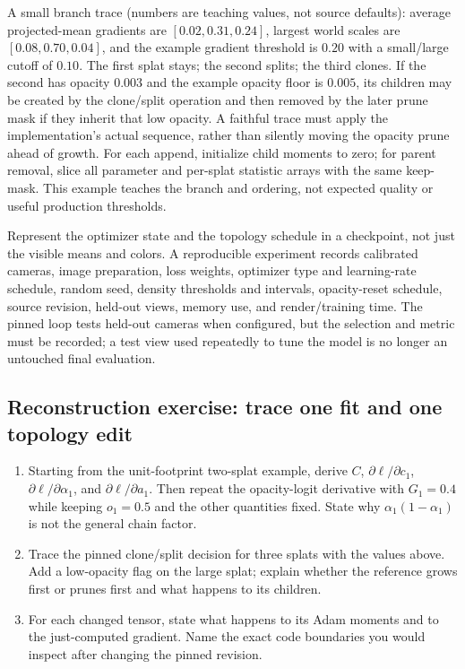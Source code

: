 A small branch trace (numbers are teaching values, not source defaults): average projected-mean gradients are \([0.02,0.31,0.24]\), largest world scales are \([0.08,0.70,0.04]\), and the example gradient threshold is \(0.20\) with a small/large cutoff of \(0.10\). The first splat stays; the second splits; the third clones. If the second has opacity \(0.003\) and the example opacity floor is \(0.005\), its children may be created by the clone/split operation and then removed by the later prune mask if they inherit that low opacity. A faithful trace must apply the implementation's actual sequence, rather than silently moving the opacity prune ahead of growth. For each append, initialize child moments to zero; for parent removal, slice all parameter and per-splat statistic arrays with the same keep-mask. This example teaches the branch and ordering, not expected quality or useful production thresholds.

Represent the optimizer state and the topology schedule in a checkpoint, not just the visible means and colors. A reproducible experiment records calibrated cameras, image preparation, loss weights, optimizer type and learning-rate schedule, random seed, density thresholds and intervals, opacity-reset schedule, source revision, held-out views, memory use, and render/training time. The pinned loop tests held-out cameras when configured, but the selection and metric must be recorded; a test view used repeatedly to tune the model is no longer an untouched final evaluation.

\subsection{Reconstruction exercise: trace one fit and one topology edit}\label{04-visual-computing-ii-ch039-reconstruction-exercise-trace-one-fit-and-one-topology-edit}

\hypertarget{04-visual-computing-ii-ch039-reconstruction-exercise-trace-one-fit-and-one-topology-edit}{}

\begin{enumerate}
\def\labelenumi{\arabic{enumi}.}
\tightlist
\item
  Starting from the unit-footprint two-splat example, derive \(C\), \(\partial\ell/\partial c_1\), \(\partial\ell/\partial\alpha_1\), and \(\partial\ell/\partial a_1\). Then repeat the opacity-logit derivative with \(G_1=0.4\) while keeping \(o_1=0.5\) and the other quantities fixed. State why \(\alpha_1(1-\alpha_1)\) is not the general chain factor.
\item
  Trace the pinned clone/split decision for three splats with the values above. Add a low-opacity flag on the large splat; explain whether the reference grows first or prunes first and what happens to its children.
\item
  For each changed tensor, state what happens to its Adam moments and to the just-computed gradient. Name the exact code boundaries you would inspect after changing the pinned revision.
\end{enumerate}

